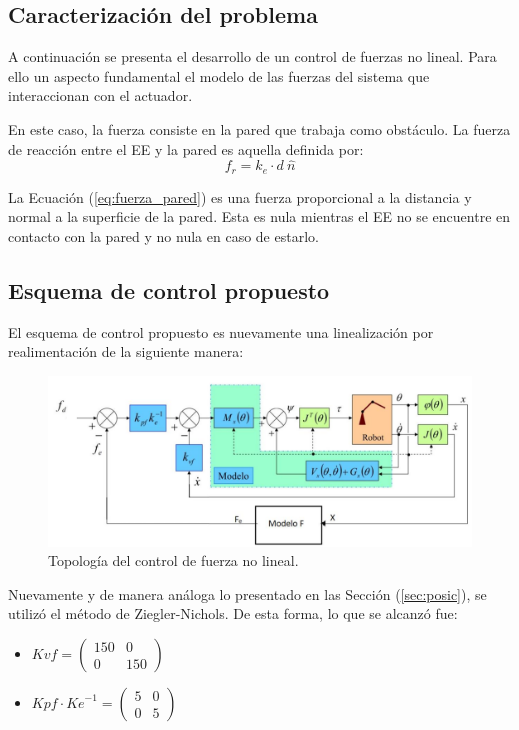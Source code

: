 %

%

\subsection{Caracterización del problema}
A continuación se presenta el desarrollo de un control de fuerzas no lineal. Para ello un aspecto fundamental el modelo de las fuerzas del sistema que interaccionan con el actuador.

En este caso, la fuerza consiste en la pared que trabaja como obstáculo. La fuerza de reacción entre el EE y la pared es aquella definida por:
\begin{equation}
f_r = k_e \cdot d \ \hat{n}
\label{eq:fuerza_pared}
\end{equation}

La Ecuación (\ref{eq:fuerza_pared}) es una fuerza proporcional a la distancia y normal a la superficie de la pared. Esta es nula mientras el EE no se encuentre en contacto con la pared y no nula en caso de estarlo.

\subsection{Esquema de control propuesto}
El esquema de control propuesto es nuevamente una linealización por realimentación de la siguiente manera:

\begin{figure}[H]
	\centering
	\includegraphics[width=0.8\linewidth]{ImagenesControl de fuerza no lineal/controlf}
	\caption{Topología del control de fuerza no lineal.}	
	\label{fig:control_f_modelo}
\end{figure}


\label{sec:fuerza_}
Nuevamente y de manera análoga lo presentado en las Sección (\ref{sec:posic}), se utilizó el método de Ziegler-Nichols. De esta forma, lo que se alcanzó fue:
\begin{multicols}{2}
\begin{itemize}
	\item $Kvf = \begin{pmatrix}
	150 & 0 \\
	0 & 150
	\end{pmatrix}$
	\item $Kpf \cdot {Ke}^{-1} =
	\begin{pmatrix}
	5 & 0 \\
	0 & 5
	\end{pmatrix}$
\end{itemize}
\end{multicols}

